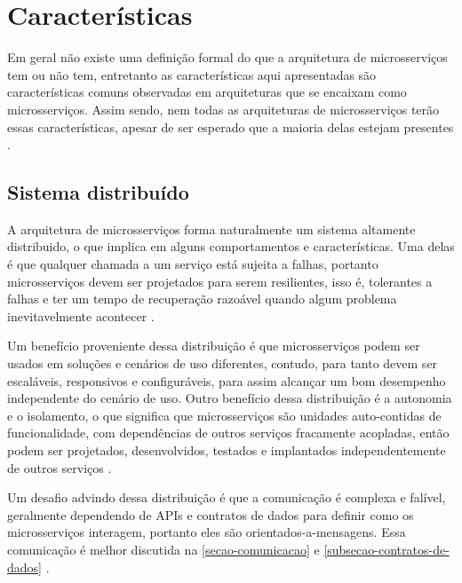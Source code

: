 \chapter{Características}\label{chapter-caracteristicas}



Em geral não existe uma definição formal do que a arquitetura de microsserviços tem ou não tem, entretanto as características aqui apresentadas são características comuns observadas em arquiteturas que se encaixam como microsserviços. Assim sendo, nem todas as arquiteturas de microsserviços terão essas características, apesar de ser esperado que a maioria delas estejam presentes \cite{martin-fowler-microservices}.

\section{Sistema distribuído}
A arquitetura de microsserviços forma naturalmente um sistema altamente distribuido, o que implica em alguns comportamentos e características. Uma delas é que qualquer chamada a um serviço está sujeita a falhas, portanto microsserviços devem ser projetados para serem resilientes, isso é, tolerantes a falhas e ter um tempo de recuperação razoável quando algum problema inevitavelmente acontecer \cite{Familiar2015}.

Um benefício proveniente dessa distribuição é que microsserviços podem ser usados em soluções e cenários de uso diferentes, contudo, para tanto devem ser escaláveis, responsivos e configuráveis, para assim alcançar um bom desempenho independente do cenário de uso. Outro benefício dessa distribuição é a autonomia e o isolamento, o que significa que microsserviços são unidades auto-contidas de funcionalidade, com dependências de outros serviços fracamente acopladas, então podem ser projetados, desenvolvidos, testados e implantados independentemente de outros serviços \cite{martin-fowler-microservices,Familiar2015}.

Um desafio advindo dessa distribuição é que a comunicação é complexa e falível, geralmente dependendo de APIs e contratos de dados para definir como os microsserviços interagem, portanto eles são orientados-a-mensagens. Essa comunicação é melhor discutida na \autoref{secao-comunicacao} e \autoref{subsecao-contratos-de-dados} \cite{Familiar2015}. 

